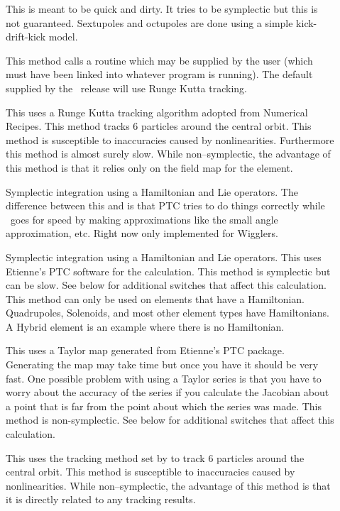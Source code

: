 \begin{description}

\item[]
This is meant to be quick and dirty. It tries to be symplectic but this
is not guaranteed. Sextupoles and octupoles are done using a simple
kick-drift-kick model.

\item[]
This method calls a routine  which may be supplied
by the user (which must have been linked into whatever program is
running).  The default  supplied by the \bmad\ release
will use Runge Kutta tracking. 

\item[]
This uses a Runge Kutta tracking algorithm adopted from Numerical Recipes.
This method tracks 6 particles around the central orbit. This method is
susceptible to inaccuracies caused by nonlinearities. Furthermore this method
is almost surely slow. While non--symplectic, the advantage of this method is
that it relies only on the field map for the element.

\item[]
Symplectic integration using a Hamiltonian and Lie operators. The
difference between this and  is that PTC tries to do things
correctly while \bmad\ goes for speed by making approximations like the small
angle approximation, etc. Right now only implemented for Wigglers.

\item[]
Symplectic integration using a Hamiltonian and Lie operators.
This uses Etienne's PTC software for the calculation.
This method is symplectic but can be slow. See below for additional switches
that affect this calculation. This method can only be used on elements that
have a Hamiltonian. Quadrupoles, Solenoids, and most other element types have
Hamiltonians. A Hybrid element is an example where there is no Hamiltonian.

\item[]
This uses a Taylor map generated from Etienne's PTC package. Generating
the map may take time but once you have it should be very fast. One
possible problem with using a Taylor series is that you have to worry about
the accuracy of the series if you calculate the Jacobian about a point that is
far from the point about which the series was made. This method is
non-symplectic. See below for additional switches that affect this
calculation.

\item[]
This uses the tracking method set by  to track 6
particles around the central orbit. This method is susceptible to inaccuracies
caused by nonlinearities. While non--symplectic, the advantage of this method
is that it is directly related to any tracking results.

\end{description}

